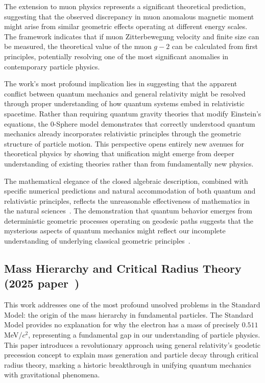 \documentclass[%
 reprint,
 amsmath,amssymb,
 aps,
]{revtex4-1}
\numberwithin{equation}{section}%
\begin{document}
The extension to muon physics represents a significant theoretical prediction, suggesting that the observed discrepancy in muon anomalous magnetic moment might arise from similar geometric effects operating at different energy scales. The framework indicates that if muon Zitterbewegung velocity and finite size can be measured, the theoretical value of the muon $g-2$ can be calculated from first principles, potentially resolving one of the most significant anomalies in contemporary particle physics.

The work's most profound implication lies in suggesting that the apparent conflict between quantum mechanics and general relativity might be resolved through proper understanding of how quantum systems embed in relativistic spacetime. Rather than requiring quantum gravity theories that modify Einstein's equations, the 0-Sphere model demonstrates that correctly understood quantum mechanics already incorporates relativistic principles through the geometric structure of particle motion. This perspective opens entirely new avenues for theoretical physics by showing that unification might emerge from deeper understanding of existing theories rather than from fundamentally new physics.

The mathematical elegance of the closed algebraic description, combined with specific numerical predictions and natural accommodation of both quantum and relativistic principles, reflects the unreasonable effectiveness of mathematics in the natural sciences~\cite{wigner1960}. The demonstration that quantum behavior emerges from deterministic geometric processes operating on geodesic paths suggests that the mysterious aspects of quantum mechanics might reflect our incomplete understanding of underlying classical geometric principles~\cite{misner1973}.

\subsection{Mass Hierarchy and Critical Radius Theory (2025 paper~\cite{hanamura2501.0130})}

This work addresses one of the most profound unsolved problems in the Standard Model: the origin of the mass hierarchy in fundamental particles. The Standard Model provides no explanation for why the electron has a mass of precisely $0.511$ MeV/$c^{2}$, representing a fundamental gap in our understanding of particle physics. This paper introduces a revolutionary approach using general relativity's geodetic precession concept to explain mass generation and particle decay through critical radius theory, marking a historic breakthrough in unifying quantum mechanics with gravitational phenomena.
\end{document}
